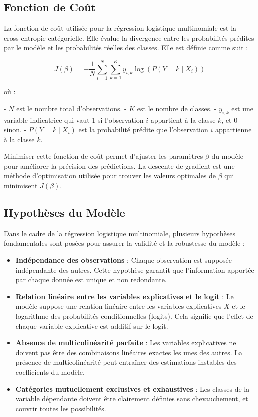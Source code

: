 \documentclass[10pt,french]{report}
\begin{document}
	\subsection{Fonction de Coût}
	La fonction de coût utilisée pour la régression logistique multinomiale est la cross-entropie catégorielle. Elle évalue la divergence entre les probabilités prédites par le modèle et les probabilités réelles des classes. Elle est définie comme suit :
	
	\[
	J(\beta) = -\frac{1}{N} \sum_{i=1}^{N} \sum_{k=1}^{K} y_{i,k} \log\left( P(Y = k \mid X_i) \right)
	\]
	
	où :
	
	- \( N \) est le nombre total d'observations.
	- \( K \) est le nombre de classes.
	- \( y_{i,k} \) est une variable indicatrice qui vaut 1 si l'observation \( i \) appartient à la classe \( k \), et 0 sinon.
	- \( P(Y = k \mid X_i) \) est la probabilité prédite que l'observation \( i \) appartienne à la classe \( k \).
	
	Minimiser cette fonction de coût permet d'ajuster les paramètres \( \beta \) du modèle pour améliorer la précision des prédictions. La descente de gradient est une méthode d'optimisation utilisée pour trouver les valeurs optimales de \( \beta \) qui minimisent \( J(\beta) \).
	
	\subsection{Hypothèses du Modèle}
	Dans le cadre de la régression logistique multinomiale, plusieurs hypothèses fondamentales sont posées pour assurer la validité et la robustesse du modèle :
	
	\begin{itemize}
		\item \textbf{Indépendance des observations} : Chaque observation est supposée indépendante des autres. Cette hypothèse garantit que l'information apportée par chaque donnée est unique et non redondante.
		
		\item \textbf{Relation linéaire entre les variables explicatives et le logit} : Le modèle suppose une relation linéaire entre les variables explicatives \( X \) et le logarithme des probabilités conditionnelles (logits). Cela signifie que l'effet de chaque variable explicative est additif sur le logit.
		
		\item \textbf{Absence de multicolinéarité parfaite} : Les variables explicatives ne doivent pas être des combinaisons linéaires exactes les unes des autres. La présence de multicolinéarité peut entraîner des estimations instables des coefficients du modèle.
		
		\item \textbf{Catégories mutuellement exclusives et exhaustives} : Les classes de la variable dépendante doivent être clairement définies sans chevauchement, et couvrir toutes les possibilités.
		
	\end{itemize}
	
\end{document}
